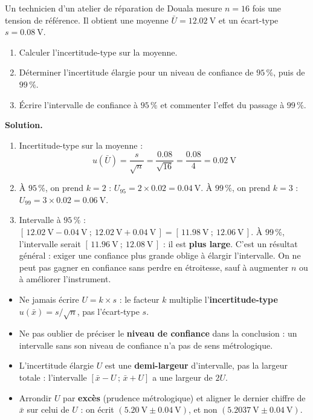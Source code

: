 \documentclass[11pt]{article}
\begin{document}
\begin{exoresolu}
Un technicien d'un atelier de réparation de Douala mesure $n = 16$ fois une tension de référence. Il obtient une moyenne $\bar{U} = \SI{12,02}{\volt}$ et un écart-type $s = \SI{0,08}{\volt}$.
\begin{enumerate}
\item Calculer l'incertitude-type sur la moyenne.
\item Déterminer l'incertitude élargie pour un niveau de confiance de $95\,\%$, puis de $99\,\%$.
\item Écrire l'intervalle de confiance à $95\,\%$ et commenter l'effet du passage à $99\,\%$.
\end{enumerate}
\tcblower
\textbf{Solution.}
\begin{enumerate}
\item Incertitude-type sur la moyenne :
\[ u(\bar{U}) = \frac{s}{\sqrt{n}} = \frac{\num{0,08}}{\sqrt{16}} = \frac{\num{0,08}}{4} = \num{0,02}~\text{V} \]
\item À $95\,\%$, on prend $k = 2$ : $U_{95} = 2 \times \num{0,02} = \SI{0,04}{\volt}$. À $99\,\%$, on prend $k = 3$ : $U_{99} = 3 \times \num{0,02} = \SI{0,06}{\volt}$.
\item Intervalle à $95\,\%$ : $[\, \SI{12,02}{\volt} - \SI{0,04}{\volt} \ ;\ \SI{12,02}{\volt} + \SI{0,04}{\volt} \,] = [\, \SI{11,98}{\volt} \ ;\ \SI{12,06}{\volt} \,]$. À $99\,\%$, l'intervalle serait $[\, \SI{11,96}{\volt} \ ;\ \SI{12,08}{\volt} \,]$ : il est \textbf{plus large}. C'est un résultat général : exiger une confiance plus grande oblige à élargir l'intervalle. On ne peut pas gagner en confiance sans perdre en étroitesse, sauf à augmenter $n$ ou à améliorer l'instrument.
\end{enumerate}
\end{exoresolu}

\begin{attention}
\begin{itemize}
\item Ne jamais écrire $U = k \times s$ : le facteur $k$ multiplie l'\textbf{incertitude-type} $u(\bar{x}) = s/\sqrt{n}$, pas l'écart-type $s$.
\item Ne pas oublier de préciser le \textbf{niveau de confiance} dans la conclusion : un intervalle sans son niveau de confiance n'a pas de sens métrologique.
\item L'incertitude élargie $U$ est une \textbf{demi-largeur} d'intervalle, pas la largeur totale : l'intervalle $[\bar{x}-U \,;\, \bar{x}+U]$ a une largeur de $2U$.
\item Arrondir $U$ par \textbf{excès} (prudence métrologique) et aligner le dernier chiffre de $\bar{x}$ sur celui de $U$ : on écrit $(\SI{5,20}{\volt} \pm \SI{0,04}{\volt})$, et non $(\SI{5,2037}{\volt} \pm \SI{0,04}{\volt})$.
\end{itemize}
\end{attention}
\end{document}
